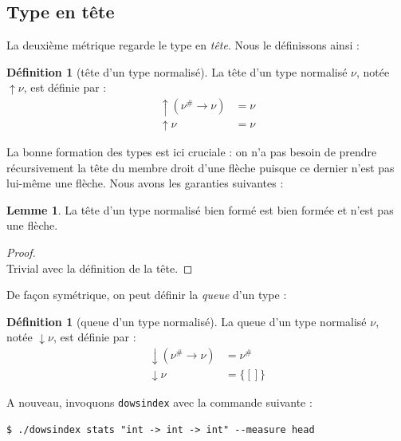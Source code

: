 \documentclass[a4paper]{report}
\newenvironment{preuve} 
  {\begin{proof}~\\} 
  {\end{proof}}
\theoremstyle{definition}
\newtheorem{definition}[theoreme]{Définition}
\newtheorem{lemme}[theoreme]{Lemme}
\newcommand{\dowsindex}{\texttt{dowsindex}\xspace}
\newcommand{\mset}[1]{\{\![#1]\!\}}
\begin{document}

\subsection{Type en tête}

La deuxième métrique regarde le type en \emph{tête}. Nous le définissons ainsi :

\begin{definition}[tête d'un type normalisé]
  La tête d'un type normalisé $\nu$, notée $\uparrow \nu$, est définie par :
  \begin{align*}
      \uparrow (\nu^\# \rightarrow \nu) &=
      \nu
    \\
      \uparrow \nu &=
      \nu
  \end{align*}
\end{definition}

La bonne formation des types est ici cruciale : on n'a pas besoin de prendre récursivement la tête du membre droit d'une flèche puisque ce dernier n'est pas lui-même une flèche. Nous avons les garanties suivantes :

\begin{lemme} \label{bf_implique_tete_bf_et_non_fleche}
  La tête d'un type normalisé bien formé est bien formée et n'est pas une flèche.
\end{lemme}

\begin{preuve}
  Trivial avec la définition de la tête.
\end{preuve}

De façon symétrique, on peut définir la \emph{queue} d'un type :

\begin{definition}[queue d'un type normalisé]
  La queue d'un type normalisé $\nu$, notée $\downarrow \nu$, est définie par :
  \begin{align*}
      \downarrow (\nu^\# \rightarrow \nu) &=
      \nu^\#
    \\
      \downarrow \nu &=
      \mset{}
  \end{align*}
\end{definition}

A nouveau, invoquons \dowsindex avec la commande suivante :

\begin{verbatim}
$ ./dowsindex stats "int -> int -> int" --measure head
\end{verbatim}
\end{document}
